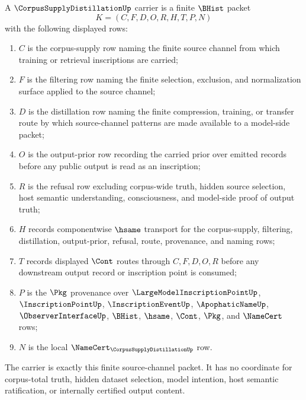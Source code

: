 \begin{definition}
\label{def:corpus-supply-distillation-carrier}
A $\CorpusSupplyDistillationUp$ carrier is a finite $\BHist$ packet
$$
K=(C,F,D,O,R,H,T,P,N)
$$
with the following displayed rows:
\begin{enumerate}
\item $C$ is the corpus-supply row naming the finite source channel from which training or retrieval inscriptions are carried;
\item $F$ is the filtering row naming the finite selection, exclusion, and normalization surface applied to the source channel;
\item $D$ is the distillation row naming the finite compression, training, or transfer route by which source-channel patterns are made available to a model-side packet;
\item $O$ is the output-prior row recording the carried prior over emitted records before any public output is read as an inscription;
\item $R$ is the refusal row excluding corpus-wide truth, hidden source selection, host semantic understanding, consciousness, and model-side proof of output truth;
\item $H$ records componentwise $\hsame$ transport for the corpus-supply, filtering, distillation, output-prior, refusal, route, provenance, and naming rows;
\item $T$ records displayed $\Cont$ routes through $C,F,D,O,R$ before any downstream output record or inscription point is consumed;
\item $P$ is the $\Pkg$ provenance over $\LargeModelInscriptionPointUp$, $\InscriptionPointUp$, $\InscriptionEventUp$, $\ApophaticNameUp$, $\ObserverInterfaceUp$, $\BHist$, $\hsame$, $\Cont$, $\Pkg$, and $\NameCert$ rows;
\item $N$ is the local $\NameCert_{\CorpusSupplyDistillationUp}$ row.
\end{enumerate}
The carrier is exactly this finite source-channel packet. It has no coordinate for corpus-total truth, hidden dataset selection, model intention, host semantic ratification, or internally certified output content.
\end{definition}

